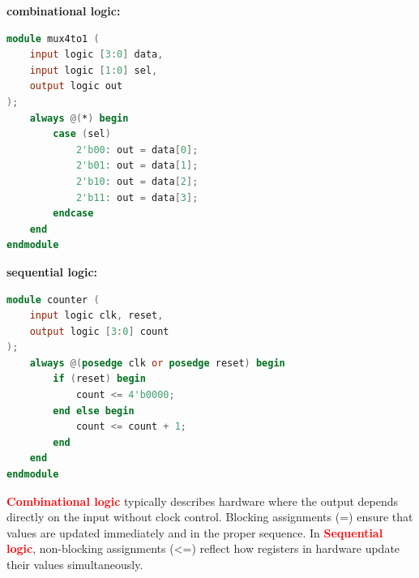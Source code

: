 \documentclass{article}
\begin{document}
\begin{multicols}{2}
    \textbf{combinational logic:}\\

    \begin{lstlisting}[language=Verilog,frame=single,backgroundcolor=\color{White},basicstyle=\color{LightGreen},showspaces=false,showstringspaces=false]
module mux4to1 (
    input logic [3:0] data,
    input logic [1:0] sel,
    output logic out
);
    always @(*) begin
        case (sel)
            2'b00: out = data[0];
            2'b01: out = data[1];
            2'b10: out = data[2];
            2'b11: out = data[3];
        endcase
    end
endmodule
    \end{lstlisting}
    \columnbreak
    \textbf{sequential logic:}\\

    \begin{lstlisting}[language=Verilog,frame=single,backgroundcolor=\color{White},basicstyle=\color{LightGreen},showspaces=false,showstringspaces=false]
module counter (
    input logic clk, reset,
    output logic [3:0] count
);
    always @(posedge clk or posedge reset) begin
        if (reset) begin
            count <= 4'b0000;
        end else begin
            count <= count + 1;
        end
    end
endmodule
    \end{lstlisting}
\end{multicols}

\textcolor{red}{\textbf{Combinational logic}} typically describes hardware where the output depends directly on the input without clock control. Blocking assignments (=) ensure that values are updated immediately and in the proper sequence. In \textcolor{red}{\textbf{Sequential logic}}, non-blocking assignments (\textless =) reflect how registers in hardware update their values simultaneously.
\end{document}
